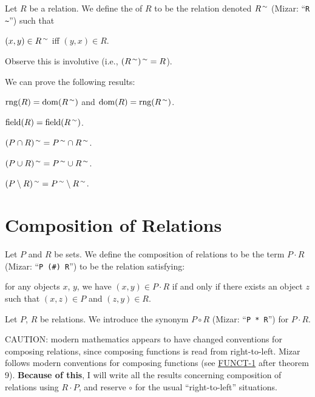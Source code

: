 \documentclass{article}
\begin{document}
\begin{definition}
Let $R$ be a relation. We define the  of $R$
to be the relation denoted $R^{\,\sim}$ (Mizar: ``\verb#R ~#'') such that
\begin{defn}
\item\label{relat1:def7} $(x,y)\in R^{\,\sim}$ iff $(y,x)\in R$.
\end{defn}
Observe this is involutive (i.e., $(R^{\,\sim})^{\,\sim}=R$).
\end{definition}

We can prove the following results:
\begin{thm}
\item\label{relat1:20} $\operatorname{rng}(R)=\operatorname{dom}(R^{\,\sim})$ and
  $\operatorname{dom}(R)=\operatorname{rng}(R^{\,\sim})$.
\item\label{relat1:21} $\operatorname{field}(R)=\operatorname{field}(R^{\,\sim})$.
\item\label{relat1:22} $(P\cap R)^{\,\sim}=P^{\,\sim}\cap R^{\,\sim}$.
\item\label{relat1:23} $(P\cup R)^{\,\sim}=P^{\,\sim}\cup R^{\,\sim}$.
\item\label{relat1:24} $(P\setminus R)^{\,\sim}=P^{\,\sim}\setminus R^{\,\sim}$.
\end{thm}

\section{Composition of Relations}

\begin{definition}
Let $P$ and $R$ be sets. We define the composition of relations to be
the term $P\cdot R$ (Mizar: ``\verb|P (#) R|'') to be the relation satisfying:
\begin{defn}
\item for any objects $x$, $y$, we have $(x,y)\in P\cdot R$ if and only
  if there exists an object $z$ such that $(x,z)\in P$ and $(z,y)\in R$.
\end{defn}
\end{definition}

\begin{notation}
Let $P$, $R$ be relations. We introduce the synonym $P\circ R$ (Mizar:
``\verb#P * R#'') for $P\cdot R$.
\end{notation}

\begin{remark}
CAUTION: modern mathematics appears to have changed conventions for
composing relations, since composing functions is read from right-to-left.
Mizar follows modern conventions for composing functions (see
\hyperlink{notation:funct1:composition}{FUNCT-1} after theorem 9).
\textbf{Because of this}, I will write all the results concerning
composition of relations using $R\cdot P$, and reserve $\circ$ for the
usual ``right-to-left'' situations.
\end{remark}
\end{document}
